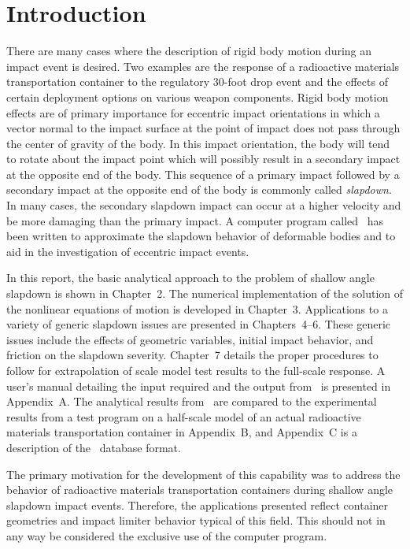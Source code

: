 \chapter{Introduction}

     There are many cases where the description of rigid body motion
during an impact event is desired.  Two examples are the response of a
radioactive materials transportation container to the regulatory
30-foot drop event and the effects of certain deployment options on
various weapon components. Rigid body motion effects are of primary
importance for eccentric impact orientations in which a vector normal
to the impact surface at the point of impact does not pass through the
center of gravity of the body.  In this impact orientation, the body
will tend to rotate about the impact point which will possibly result
in a secondary impact at the opposite end of the body.  This sequence
of a primary impact followed by a secondary impact at the opposite end
of the body is commonly called {\em slapdown}.  In many cases, the
secondary slapdown impact can occur at a higher velocity and be more
damaging than the primary impact. A computer program called \SLAP\ has
been written to approximate the slapdown behavior of deformable bodies
and to aid in the investigation of eccentric impact events.

In this report, the basic analytical approach to the problem of shallow angle
slapdown is shown in Chapter~2.  The numerical implementation of the solution
of the nonlinear equations of motion is developed in Chapter~3.  Applications
to a variety of generic slapdown issues are presented in Chapters~4--6.  These
generic issues include the effects of geometric variables, initial impact
behavior, and friction on the slapdown severity.  Chapter~7 details the proper
procedures to follow for extrapolation of scale model test results to the
full-scale response. A user's manual detailing the input required and the
output from \SLAP\ is presented in Appendix~A. The analytical results from
\SLAP\ are compared to the experimental results from a test program on a
half-scale model of an actual radioactive materials transportation container in
Appendix~B, and Appendix~C is a description of the \EXO\ database format.

The primary motivation for the development of this capability was to address
the behavior of radioactive materials transportation containers during shallow
angle slapdown impact events.  Therefore, the applications presented reflect
container geometries and impact limiter behavior typical of this field.  This
should not in any way be considered the exclusive use of the computer program.

